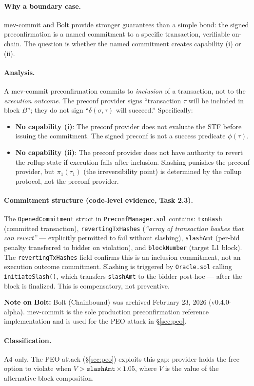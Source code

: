 \paragraph{Why a boundary case.}
mev-commit and Bolt provide stronger guarantees than a simple bond: the signed
preconfirmation is a named commitment to a specific transaction, verifiable
on-chain. The question is whether the named commitment creates capability (i)
or (ii).

\paragraph{Analysis.}
A mev-commit preconfirmation commits to \emph{inclusion} of a transaction, not
to the \emph{execution outcome}. The preconf provider signs ``transaction $\tau$
will be included in block $B$''; they do not sign ``$\delta(\sigma, \tau)$ will
succeed.'' Specifically:
\begin{itemize}
  \item \textbf{No capability (i)}: The preconf provider does not evaluate the
    STF before issuing the commitment. The signed preconf is not a success
    predicate $\phi(\tau)$.
  \item \textbf{No capability (ii)}: The preconf provider does not have authority
    to revert the rollup state if execution fails after inclusion. Slashing
    punishes the preconf provider, but $\pi_1(\tau_1)$ (the irreversibility point)
    is determined by the rollup protocol, not the preconf provider.
\end{itemize}

\paragraph{Commitment structure (code-level evidence, Task 2.3).}
The \texttt{OpenedCommitment} struct in \texttt{PreconfManager.sol} contains:
\texttt{txnHash} (committed transaction), \texttt{revertingTxHashes}
(\emph{``array of transaction hashes that can revert''} --- explicitly permitted
to fail without slashing), \texttt{slashAmt} (per-bid penalty transferred to
bidder on violation), and \texttt{blockNumber} (target L1 block).
The \texttt{revertingTxHashes} field confirms this is an inclusion commitment,
not an execution outcome commitment. Slashing is triggered by \texttt{Oracle.sol}
calling \texttt{initiateSlash()}, which transfers \texttt{slashAmt} to the
bidder post-hoc --- after the block is finalized. This is compensatory, not
preventive.

\textbf{Note on Bolt:} Bolt (Chainbound) was archived February 23, 2026
(v0.4.0-alpha). mev-commit is the sole production preconfirmation reference
implementation and is used for the PEO attack in \S\ref{sec:peo}.

\paragraph{Classification.} A4 only. The PEO attack (\S\ref{sec:peo})
exploits this gap: provider holds the free option to violate when
$V > \texttt{slashAmt} \times 1.05$, where $V$ is the value of the
alternative block composition.
